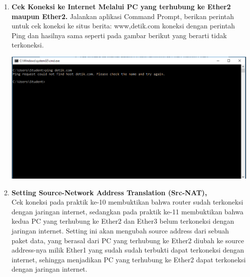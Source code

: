 \documentclass[a4paper,12pt]{article}
\begin{document}
\begin{enumerate}
	\item \textbf{Cek Koneksi ke Internet Melalui PC yang terhubung ke Ether2 maupun Ether2.}
	Jalankan aplikasi Command Prompt, berikan perintah untuk cek koneksi ke situs berita: www,detik.com koneksi dengan perintah Ping dan hasilnya sama seperti pada gambar berikut yang berarti tidak terkoneksi.
	\begin{center}
		\includegraphics[scale=.5]{Capture12}
	\end{center}
	
	\item \textbf{Setting Source-Network Address Translation (Src-NAT),}\\
	Cek koneksi pada praktik ke-10 membuktikan bahwa router sudah terkoneksi dengan jaringan internet, sedangkan pada praktik ke-11 membuktikan bahwa kedua PC yang terhubung ke Ether2 dan Ether3 belum terkoneksi dengan jaringan internet. Setting ini akan mengubah source address dari sebuah paket data, yang berasal dari PC yang terhubung ke Ether2 diubah ke source address-nya milik Ether1 yang sudah sudah terbukti dapat terkoneksi dengan internet, sehingga menjadikan PC yang terhubung ke Ether2 dapat terkoneksi dengan jaringan internet.
	

\end{enumerate}
\end{document}
